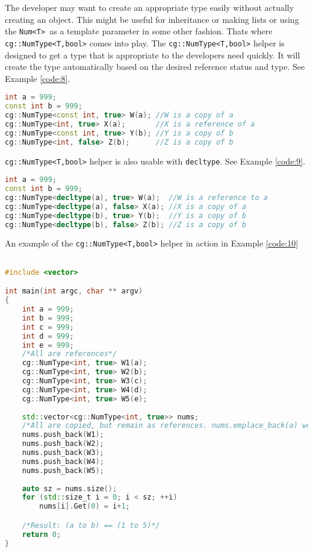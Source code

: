 \documentclass{article}
\newcommand{\theobj}{\protect\Verb+Num<T> +}
\begin{document}
The developer may want to create an appropriate type easily without actually creating an object. This might be useful for inheritance or making lists or using the \theobj as a template parameter in some other fashion. Thats where \protect\Verb+cg::NumType<T,bool>+ comes into play.  The \protect\Verb+cg::NumType<T,bool>+ helper is designed to get a type that is appropriate to the developers need quickly.  It will create the type automatically based on the desired reference status and type. See Example \vref{code:8}.

\begin{lstlisting}[language=C++, label=code:8, caption=NumType Helper]
int a = 999;
const int b = 999;
cg::NumType<const int, true> W(a); //W is a copy of a
cg::NumType<int, true> X(a);       //X is a reference of a
cg::NumType<const int, true> Y(b); //Y is a copy of b
cg::NumType<int, false> Z(b);      //Z is a copy of b
\end{lstlisting}

\Verb+cg::NumType<T,bool>+ helper is also usable with \Verb+decltype+. See Example \vref{code:9}.
\pagebreak
\begin{lstlisting}[language=C++, label=code:9, caption=NumType Helper and decltype]
int a = 999;
const int b = 999;
cg::NumType<decltype(a), true> W(a);  //W is a reference to a
cg::NumType<decltype(a), false> X(a); //X is a copy of a
cg::NumType<decltype(b), true> Y(b);  //Y is a copy of b
cg::NumType<decltype(b), false> Z(b); //Z is a copy of b
\end{lstlisting}
An example of the \Verb+cg::NumType<T,bool>+ helper in action in Example \vref{code:10}

\begin{lstlisting}[language=C++, label=code:10, caption=NumType Helper Useful Use]

#include <vector>

int main(int argc, char ** argv)
{
	int a = 999;
	int b = 999;
	int c = 999;
	int d = 999;
	int e = 999;
	/*All are references*/
	cg::NumType<int, true> W1(a); 
	cg::NumType<int, true> W2(b); 
	cg::NumType<int, true> W3(c); 
	cg::NumType<int, true> W4(d); 
	cg::NumType<int, true> W5(e); 
	
	std::vector<cg::NumType<int, true>> nums;
	/*All are copied, but remain as references. nums.emplace_back(a) would work as well.*/
	nums.push_back(W1);
	nums.push_back(W2);
	nums.push_back(W3);
	nums.push_back(W4);
	nums.push_back(W5);
	
	auto sz = nums.size();
	for (std::size_t i = 0; i < sz; ++i)
		nums[i].Get(0) = i+1;

	/*Result: (a to b) == (1 to 5)*/
	return 0;
}
\end{lstlisting}
\pagebreak
\end{document}
